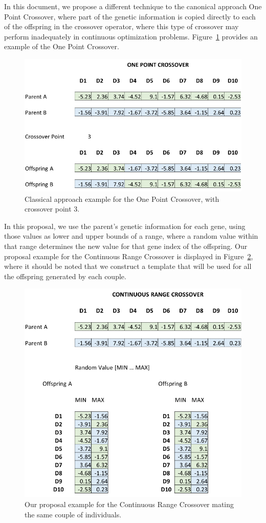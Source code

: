 \documentclass[graybox]{svmult}
\begin{document}
    In this document, we propose a different technique to the canonical approach One Point Crossover, where part of the genetic information is copied directly to each of the offspring in the crossover operator, where this type of crossover may perform inadequately in continuous optimization problems. Figure~\ref{fig.onepoint_crossover} provides an example of the One Point Crossover.

    \begin{figure}[!ht]
        \centering
        \includegraphics[width=0.70\linewidth]{img/fig_onepoint_crossover.pdf}
        \caption{Classical approach example for the One Point Crossover, with crossover point 3.} \label{fig.onepoint_crossover}
        \end{figure}

    In this proposal, we use the parent's genetic information for each gene, using those values as lower and upper bounds of a range, where a random value within that range determines the new value for that gene index of the offspring. Our proposal example for the Continuous Range Crossover is displayed in Figure~\ref{fig.contrange_crossover}, where it should be noted that we construct a template that will be used for all the offspring generated by each couple.

    \begin{figure}[!ht]
        \centering
        \includegraphics[width=0.70\linewidth]{img/fig_contrange_crossover.pdf}
        \caption{Our proposal example for the Continuous Range Crossover mating the same couple of individuals.} \label{fig.contrange_crossover}
        \end{figure}        
    
\end{document}

